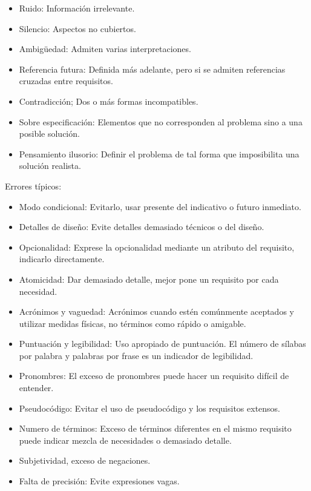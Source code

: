 \documentclass[12pt, twoside, openright]{report} %
\begin{document}
    \begin{itemize}
    
    \item
      Ruido: Información irrelevante.
    \item
      Silencio: Aspectos no cubiertos.
    \item
      Ambigüedad: Admiten varias interpretaciones.
    \item
      Referencia futura: Definida más adelante, pero si se admiten
      referencias cruzadas entre requisitos.
    \item
      Contradicción; Dos o más formas incompatibles.
    \item
      Sobre especificación: Elementos que no corresponden al problema
      sino a una posible solución.
    \item
      Pensamiento ilusorio: Definir el problema de tal forma que
      imposibilita una solución realista.
    \end{itemize}

	Errores típicos:

    \begin{itemize}
    
    \item
      Modo condicional: Evitarlo, usar presente del indicativo o futuro
      inmediato.
    \item
      Detalles de diseño: Evite detalles demasiado técnicos o del
      diseño.
    \item
      Opcionalidad: Exprese la opcionalidad mediante un atributo del
      requisito, indicarlo directamente.
    \item
      Atomicidad: Dar demasiado detalle, mejor pone un requisito por
      cada necesidad.
    \item
      Acrónimos y vaguedad: Acrónimos cuando estén comúnmente aceptados
      y utilizar medidas físicas, no términos como rápido o amigable.
    \item
      Puntuación y legibilidad: Uso apropiado de puntuación. El número
      de sílabas por palabra y palabras por frase es un indicador de
      legibilidad.
    \item
      Pronombres: El exceso de pronombres puede hacer un requisito
      difícil de entender.
    \item
      Pseudocódigo: Evitar el uso de pseudocódigo y los requisitos
      extensos.
    \item
      Numero de términos: Exceso de términos diferentes en el mismo
      requisito puede indicar mezcla de necesidades o demasiado detalle.
	\item
	  Subjetividad, exceso de negaciones.
	\item
	  Falta de precisión: Evite expresiones vagas.
    \end{itemize}
  \pagebreak
\end{document}
